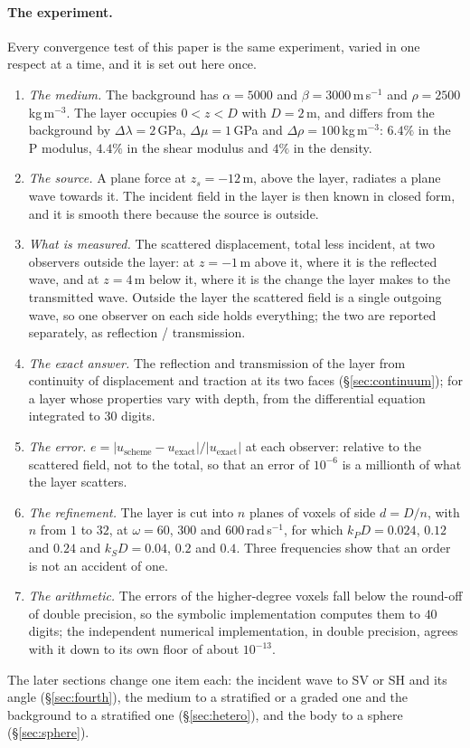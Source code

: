 \documentclass[11pt,a4paper]{article}
\begin{document}
\paragraph{The experiment.} Every convergence test of this paper is the same experiment, varied in one
respect at a time, and it is set out here once.
\begin{enumerate}
\item \emph{The medium.} The background has $\alpha=5000$ and $\beta=3000$\,m\,s$^{-1}$ and
$\rho=2500$\,kg\,m$^{-3}$. The layer occupies $0<z<D$ with $D=2$\,m, and differs from the background by
$\Delta\lambda=2$\,GPa, $\Delta\mu=1$\,GPa and $\Delta\rho=100$\,kg\,m$^{-3}$: $6.4\%$ in the P modulus,
$4.4\%$ in the shear modulus and $4\%$ in the density.
\item \emph{The source.} A plane force at $z_s=-12$\,m, above the layer, radiates a plane wave towards
it. The incident field in the layer is then known in closed form, and it is smooth there because the
source is outside.
\item \emph{What is measured.} The scattered displacement, total less incident, at two observers
outside the layer: at $z=-1$\,m above it, where it is the reflected wave, and at $z=4$\,m below it,
where it is the change the layer makes to the transmitted wave. Outside the layer the scattered field
is a single outgoing wave, so one observer on each side holds everything; the two are reported
separately, as reflection / transmission.
\item \emph{The exact answer.} The reflection and transmission of the layer from continuity of
displacement and traction at its two faces (\S\ref{sec:continuum}); for a layer whose properties vary
with depth, from the differential equation integrated to $30$ digits.
\item \emph{The error.} $e=\lvert u_{\text{scheme}}-u_{\text{exact}}\rvert/\lvert u_{\text{exact}}\rvert$
at each observer: relative to the scattered field, not to the total, so that an error of $10^{-6}$ is a
millionth of what the layer scatters.
\item \emph{The refinement.} The layer is cut into $n$ planes of voxels of side $d=D/n$, with $n$ from
$1$ to $32$, at $\omega=60$, $300$ and $600$\,rad\,s$^{-1}$, for which $k_PD=0.024$, $0.12$ and $0.24$
and $k_SD=0.04$, $0.2$ and $0.4$. Three frequencies show that an order is not an accident of one.
\item \emph{The arithmetic.} The errors of the higher-degree voxels fall below the round-off of double
precision, so the symbolic implementation computes them to $40$ digits; the independent numerical
implementation, in double precision, agrees with it down to its own floor of about $10^{-13}$.
\end{enumerate}
The later sections change one item each: the incident wave to SV or SH and its angle
(\S\ref{sec:fourth}), the medium to a stratified or a graded one and the background to a stratified one
(\S\ref{sec:hetero}), and the body to a sphere (\S\ref{sec:sphere}).
\end{document}
